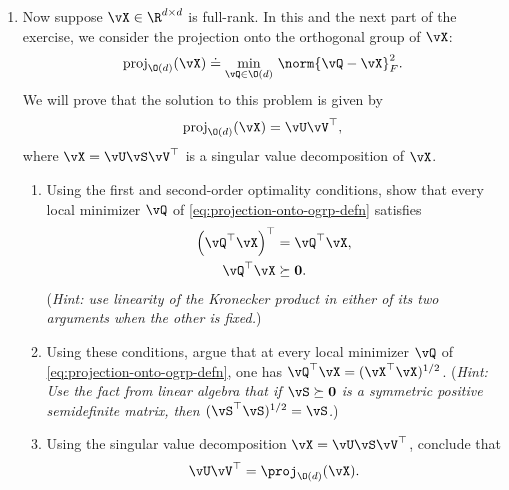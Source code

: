 \documentclass[../../book-main.tex]{subfiles}
\begin{document}
\begin{exercise}
\begin{enumerate}
        \item Now suppose $\vX \in \R^{d\times d}$ is full-rank. In
            this and the next part of the exercise, we consider the
            projection onto the orthogonal group of $\vX$:
            \begin{equation}\label{eq:projection-onto-ogrp-defn}
                \mathrm{proj}_{\O(d)}(\vX) \doteq
                \min_{\vQ \in \O(d)
                }\, \norm{\vQ - \vX}_F^2.
            \end{equation}
            We will prove that the solution to this problem is given by
            \begin{equation*}
                \mathrm{proj}_{\O(d)}(\vX)
                =
                \vU \vV^\top,
            \end{equation*}
            where $\vX = \vU \vS \vV^\top$ is a singular value
            decomposition of $\vX$.

            \begin{enumerate}
                \item Using the first and second-order optimality
                    conditions, show that every local minimizer $\vQ$
                    of \eqref{eq:projection-onto-ogrp-defn} satisfies
                    \begin{align*}
                        \left( \vQ^\top \vX \right)^\top &= \vQ^\top \vX, \\
                        \vQ^\top \vX &\succeq \mathbf{0}.
                    \end{align*}
                    (\textit{Hint: use linearity of the Kronecker
                            product in either of its two arguments when the
                    other is fixed.})
                \item Using these conditions, argue that at every
                    local minimizer $\vQ$ of
                    \eqref{eq:projection-onto-ogrp-defn}, one has
                    $\vQ^\top \vX = (\vX^\top \vX)^{1/2}$.
                    (\textit{Hint: Use %
                            the fact from linear algebra that if $\vS \succeq
                            \mathbf{0}$ is a symmetric positive semidefinite
                    matrix, then $(\vS^\top\vS)^{1/2} = \vS$.})
                \item Using the singular value decomposition $\vX =
                    \vU \vS \vV^\top$, conclude that
                    \begin{equation*}
                        \vU \vV^\top
                        =
                        \proj_{\O(d)}(\vX).
                    \end{equation*}
            \end{enumerate}
    \end{enumerate}
\end{exercise}
\end{document}
